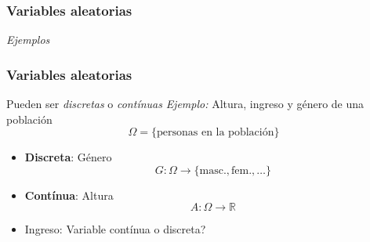 \documentclass[xcolor=dvipsnames,10pt]{beamer}
\begin{document}
%
\begin{frame}
  \frametitle{Variables aleatorias}
  \emph{Ejemplos}
\end{frame}
%
\begin{frame}
  \frametitle{Variables aleatorias}
  Pueden ser \emph{discretas} o \emph{contínuas}
  \emph{Ejemplo:} Altura, ingreso y género de una población
  \begin{equation*}
    \Omega = \{ \text{personas en la población} \}
  \end{equation*}
  \begin{itemize}
  \item \textbf{Discreta}: Género
    \begin{equation*}
      G \colon \Omega \to \{ \text{masc.}, \text{fem.}, \dots \}
    \end{equation*}
  \item \textbf{Contínua}: Altura
    \begin{equation*}
      A \colon \Omega \to \mathbb{R}
    \end{equation*}
  \item Ingreso: Variable contínua o discreta?
  \end{itemize}
\end{frame}
%
\end{document}
